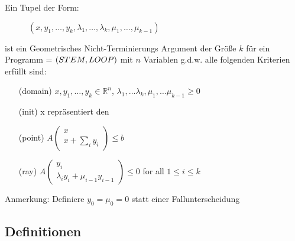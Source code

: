 \begin{frame}
	\begin{definition}
		\label{def:gna}
		Ein Tupel der Form:
		\vspace{-1em}
		\begin{figure}
			\centering
			$(x, y_1, \dots, y_k, \lambda_1, \dots, \lambda_k, \mu_1, \dots, \mu_{k-1})$
		\end{figure}  
		\vspace{-1em}
		ist ein Geometrisches Nicht-Terminierungs Argument der Gr\"o\ss e $k$ f\"ur ein Programm = $(STEM, LOOP)$ mit $n$ Variablen g.d.w. alle folgenden Kriterien erf\"ullt sind:
		\begin{itemize}
			\setlength{\itemindent}{1in}
			\item[(domain)] $x, y_1, \dots, y_k \in \mathbb{R}^n$, $\lambda_1, \dots \lambda_k, \mu_1, \dots \mu_{k-1} \ge 0$
			\item[(init)] x repr\"asentiert den \stem
			\item[(point)] $A\begin{pmatrix} x \\ x + \sum_i y_i \end{pmatrix} \le b$
			\item[(ray)] $A\begin{pmatrix} y_i \\ \lambda_i y_i + \mu_{i-1} y_{i-1} \end{pmatrix} \le 0$ for all $1 \le i \le k$
		\end{itemize}
		Anmerkung: Definiere $y_0 = \mu_0 = 0$ statt einer Fallunterscheidung
	\end{definition}
\end{frame}

\subsection{Definitionen}

